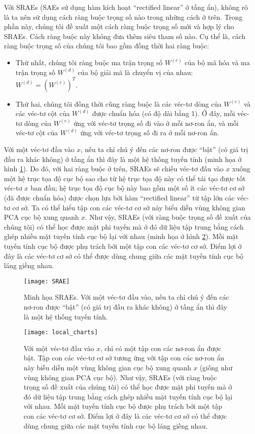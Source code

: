 Với SRAEs (SAEs sử dụng hàm kích hoạt ``rectified linear'' ở tầng ẩn), không rõ là ta nên sử dụng cách ràng buộc trọng số nào trong những cách ở trên. Trong phần này, chúng tôi đề xuất một cách ràng buộc trọng số mới và hợp lý cho SRAEs. Cách ràng buộc này không đưa thêm siêu tham số nào. Cụ thể là, cách ràng buộc trọng số của chúng tôi bao gồm đồng thời hai ràng buộc:
\begin{itemize}
	\item Thứ nhất, chúng tôi ràng buộc ma trận trọng số $W^{(e)}$ của bộ mã hóa và ma trận trọng số $W^{(d)}$ của bộ giải mã là chuyển vị của nhau: $W^{(d)} = (W^{(e)})^T$.
	\item Thứ hai, chúng tôi đồng thời cũng ràng buộc là các véc-tơ dòng của $W^{(e)}$ và các véc-tơ cột của $W^{(d)}$ được chuẩn hóa (có độ dài bằng 1). Ở đây, mỗi véc-tơ dòng của $W^{(e)}$ ứng với véc-tơ trọng số đi vào ở mỗi nơ-ron ẩn, và mỗi véc-tơ cột của $W^{(d)}$ ứng với véc-tơ trọng số đi ra ở mỗi nơ-ron ẩn.
\end{itemize}

Với một véc-tơ đầu vào $x$, nếu ta chỉ chú ý đến các nơ-ron được ``bật'' (có giá trị đầu ra khác không) ở tầng ẩn thì đây là một hệ thống tuyến tính (minh họa ở hình \ref{fig_SRAE}). Do đó, với hai ràng buộc ở trên, SRAEs sẽ chiếu véc-tơ đầu vào $x$ xuống một hệ trục tọa độ cục bộ sao cho từ hệ trục tọa độ này có thể tái tạo được tốt véc-tơ $x$ ban đầu; hệ trục tọa độ cục bộ này bao gồm một số ít các véc-tơ cơ sở (đã được chuẩn hóa) được chọn lựa bởi hàm ``rectified linear'' từ tập lớn các véc-tơ cơ sở. Ta có thể hiểu tập con các véc-tơ cơ sở này biểu diễn vùng không gian PCA cục bộ xung quanh $x$. Như vậy, SRAEs (với ràng buộc trọng số đề xuất của chúng tôi) có thể học được mặt phi tuyến mà ở đó dữ liệu tập trung bằng cách ghép nhiều mặt tuyến tính cục bộ lại với nhau (minh họa ở hình \ref{fig_local_charts}). Mỗi mặt tuyến tính cục bộ được phụ trách bởi một tập con các véc-tơ cơ sở. Điểm lợi ở đây là các véc-tơ cơ sở có thể được dùng chung giữa các mặt tuyến tính cục bộ láng giềng nhau.

\begin{figure}
	\centering
	\texttt{[image: SRAE]}
	\caption[Minh họa SRAEs]{Minh họa SRAEs. Với một véc-tơ đầu vào, nếu ta chỉ chú ý đến các nơ-ron được ``bật'' (có giá trị đầu ra khác không) ở tầng ẩn thì đây là một hệ thống tuyến tính.}
	\label{fig_SRAE}
\end{figure}
\begin{figure}
	\centering
	\texttt{[image: local\_charts]}
	\caption[Minh họa mặt phi tuyến mà SRAEs học được]{Với một véc-tơ đầu vào $x$, chỉ có một tập con các nơ-ron ẩn được bật. Tập con các véc-tơ cơ sở tương ứng với tập con các nơ-ron ẩn này biễu diễn một vùng không gian cục bộ xung quanh $x$ (giống như vùng không gian PCA cục bộ). Như vậy, SRAEs (với ràng buộc trọng số đề xuất của chúng tôi) có thể học được mặt phi tuyến mà ở đó dữ liệu tập trung bằng cách ghép nhiều mặt tuyến tính cục bộ lại với nhau. Mỗi mặt tuyến tính cục bộ được phụ trách bởi một tập con các véc-tơ cơ sở. Điểm lợi ở đây là các véc-tơ cơ sở có thể được dùng chung giữa các mặt tuyến tính cục bộ láng giềng nhau.}
	\label{fig_local_charts}
\end{figure}


